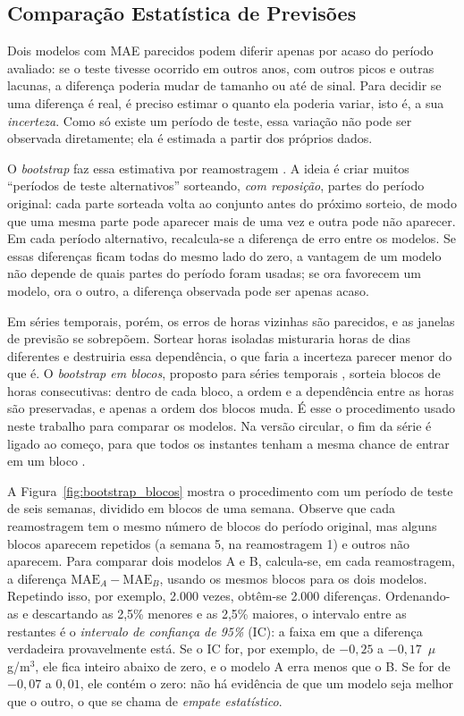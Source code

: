 \subsection{Comparação Estatística de Previsões}
\label{sec:comparacao_estatistica}

Dois modelos com MAE parecidos podem diferir apenas por acaso do período avaliado: se o teste tivesse ocorrido em outros anos, com outros picos e outras lacunas, a diferença poderia mudar de tamanho ou até de sinal. Para decidir se uma diferença é real, é preciso estimar o quanto ela poderia variar, isto é, a sua \emph{incerteza}. Como só existe um período de teste, essa variação não pode ser observada diretamente; ela é estimada a partir dos próprios dados.

O \emph{bootstrap} faz essa estimativa por reamostragem \cite{efron1979bootstrap}. A ideia é criar muitos ``períodos de teste alternativos'' sorteando, \emph{com reposição}, partes do período original: cada parte sorteada volta ao conjunto antes do próximo sorteio, de modo que uma mesma parte pode aparecer mais de uma vez e outra pode não aparecer. Em cada período alternativo, recalcula-se a diferença de erro entre os modelos. Se essas diferenças ficam todas do mesmo lado do zero, a vantagem de um modelo não depende de quais partes do período foram usadas; se ora favorecem um modelo, ora o outro, a diferença observada pode ser apenas acaso.

Em séries temporais, porém, os erros de horas vizinhas são parecidos, e as janelas de previsão se sobrepõem. Sortear horas isoladas misturaria horas de dias diferentes e destruiria essa dependência, o que faria a incerteza parecer menor do que é. O \emph{bootstrap em blocos}, proposto para séries temporais \cite{kunsch1989jackknife,politis1992circular}, sorteia blocos de horas consecutivas: dentro de cada bloco, a ordem e a dependência entre as horas são preservadas, e apenas a ordem dos blocos muda. É esse o procedimento usado neste trabalho para comparar os modelos. Na versão circular, o fim da série é ligado ao começo, para que todos os instantes tenham a mesma chance de entrar em um bloco \cite{politis1992circular}.

A Figura~\ref{fig:bootstrap_blocos} mostra o procedimento com um período de teste de seis semanas, dividido em blocos de uma semana. Observe que cada reamostragem tem o mesmo número de blocos do período original, mas alguns blocos aparecem repetidos (a semana 5, na reamostragem 1) e outros não aparecem. Para comparar dois modelos A e B, calcula-se, em cada reamostragem, a diferença \(\text{MAE}_A-\text{MAE}_B\), usando os mesmos blocos para os dois modelos. Repetindo isso, por exemplo, 2.000 vezes, obtêm-se 2.000 diferenças. Ordenando-as e descartando as 2,5\% menores e as 2,5\% maiores, o intervalo entre as restantes é o \emph{intervalo de confiança de 95\%} (IC): a faixa em que a diferença verdadeira provavelmente está. Se o IC for, por exemplo, de \(-0{,}25\) a \(-0{,}17\)~\(\mu\)g/m\(^3\), ele fica inteiro abaixo de zero, e o modelo A erra menos que o B. Se for de \(-0{,}07\) a \(0{,}01\), ele contém o zero: não há evidência de que um modelo seja melhor que o outro, o que se chama de \emph{empate estatístico}.

